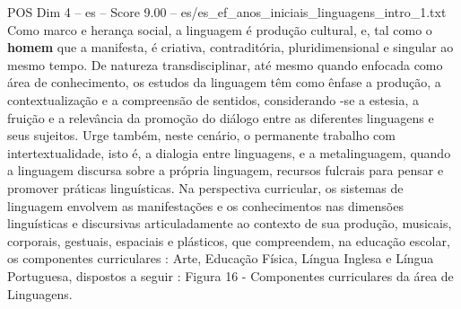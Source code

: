 \begin{textsample}{POS Dim 4 – es – Score 9.00 – es/es\_ef\_anos\_iniciais\_linguagens\_intro\_1.txt}
Como marco e herança social, a linguagem é produção cultural, e, tal como o \textbf{homem} que a manifesta, é criativa, contraditória, pluridimensional e singular ao mesmo tempo.
De natureza transdisciplinar, até mesmo quando enfocada como área de conhecimento, os estudos da linguagem têm como ênfase a produção, a contextualização e a compreensão de sentidos, considerando -se a estesia, a fruição e a relevância da promoção do diálogo entre as diferentes linguagens e seus sujeitos.
Urge também, neste cenário, o permanente trabalho com intertextualidade, isto é, a dialogia entre linguagens, e a metalinguagem, quando a linguagem discursa sobre a própria linguagem, recursos fulcrais para pensar e promover práticas linguísticas.
Na perspectiva curricular, os sistemas de linguagem envolvem as manifestações e os conhecimentos nas dimensões linguísticas e discursivas articuladamente ao contexto de sua produção, musicais, corporais, gestuais, espaciais e plásticos, que compreendem, na educação escolar, os componentes curriculares : Arte, Educação Física, Língua Inglesa e Língua Portuguesa, dispostos a seguir : Figura 16 - Componentes curriculares da área de Linguagens.

\end{textsample}
